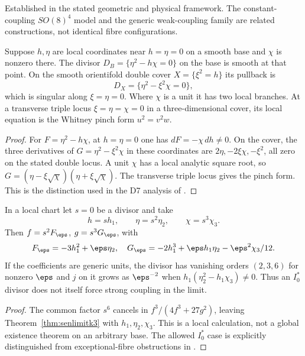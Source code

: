 \begin{verdict}[claim 22]
Established in the stated geometric and physical framework. The constant-coupling $SO(8)^4$ model and the generic weak-coupling family are related constructions, not identical fibre configurations.
\end{verdict}

\begin{proposition}\label{prop:senlimitcy}
Suppose $h,\eta$ are local coordinates near $h=\eta=0$ on a smooth base and $\chi$ is nonzero there. The divisor $D_B=\{\eta^2-h\chi=0\}$ on the base is smooth at that point. On the smooth orientifold double cover $X=\{\xi^2=h\}$ its pullback is
\[
D_X=\{\eta^2-\xi^2\chi=0\},
\]
which is singular along $\xi=\eta=0$. Where $\chi$ is a unit it has two local branches. At a transverse triple locus $\xi=\eta=\chi=0$ in a three-dimensional cover, its local equation is the Whitney pinch form $u^2=v^2w$.
\end{proposition}
\begin{proof}
For $F=\eta^2-h\chi$, at $h=\eta=0$ one has $dF=-\chi\,dh\ne0$. On the cover, the three derivatives of $G=\eta^2-\xi^2\chi$ in these coordinates are $2\eta,-2\xi\chi,-\xi^2$, all zero on the stated double locus. A unit $\chi$ has a local analytic square root, so $G=(\eta-\xi\sqrt\chi)(\eta+\xi\sqrt\chi)$. The transverse triple locus gives the pinch form. This is the distinction used in the D7 analysis of \cite{CDE09}.
\end{proof}

\begin{proposition}\label{prop:i0star}
In a local chart let $s=0$ be a divisor and take
\[
h=s h_1,\qquad\eta=s^2\eta_2,\qquad\chi=s^3\chi_3.
\]
Then $f=s^2F_\eps$, $g=s^3G_\eps$, with
\[
F_\eps=-3h_1^2+\eps\eta_2,\quad
G_\eps=-2h_1^3+\eps h_1\eta_2-\eps^2\chi_3/12.
\]
If the coefficients are generic units, the divisor has vanishing orders $(2,3,6)$ for nonzero $\eps$ and $j$ on it grows as $\eps^{-2}$ when $h_1(\eta_2^2-h_1\chi_3)\ne0$. Thus an $I_0^*$ divisor does not itself force strong coupling in the limit.
\end{proposition}
\begin{proof}
The common factor $s^6$ cancels in $f^3/(4f^3+27g^2)$, leaving Theorem~\ref{thm:senlimitk3} with $h_1,\eta_2,\chi_3$. This is a local calculation, not a global existence theorem on an arbitrary base. The allowed $I_0^*$ case is explicitly distinguished from exceptional-fibre obstructions in \cite{HLS18}.
\end{proof}

